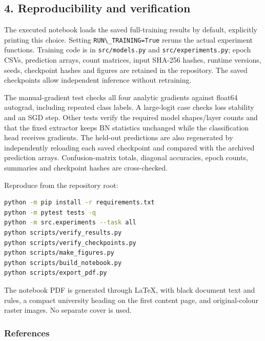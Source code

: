 \documentclass[10pt,a4paper]{article}
\newcommand{\passthrough}[1]{#1}
\begin{document}
\subsection{4. Reproducibility and verification}\label{reproducibility-and-verification}

The executed notebook loads the saved full-training results by default, explicitly printing this choice. Setting \passthrough{\lstinline!RUN\_TRAINING=True!} reruns the actual experiment functions. Training code is in \passthrough{\lstinline!src/models.py!} and \passthrough{\lstinline!src/experiments.py!}; epoch CSVs, prediction arrays, count matrices, input SHA-256 hashes, runtime versions, seeds, checkpoint hashes and figures are retained in the repository. The saved checkpoints allow independent inference without retraining.

The manual-gradient test checks all four analytic gradients against float64 autograd, including repeated class labels. A large-logit case checks loss stability and an SGD step. Other tests verify the required model shapes/layer counts and that the fixed extractor keeps BN statistics unchanged while the classification head receives gradients. The held-out predictions are also regenerated by independently reloading each saved checkpoint and compared with the archived prediction arrays. Confusion-matrix totals, diagonal accuracies, epoch counts, summaries and checkpoint hashes are cross-checked.

Reproduce from the repository root:

\begin{lstlisting}[language=bash]
python -m pip install -r requirements.txt
python -m pytest tests -q
python -m src.experiments --task all
python scripts/verify_results.py
python scripts/verify_checkpoints.py
python scripts/make_figures.py
python scripts/build_notebook.py
python scripts/export_pdf.py
\end{lstlisting}

The notebook PDF is generated through LaTeX, with black document text and rules, a compact university heading on the first content page, and original-colour raster images. No separate cover is used.

\subsubsection{References}\label{references}
\end{document}
